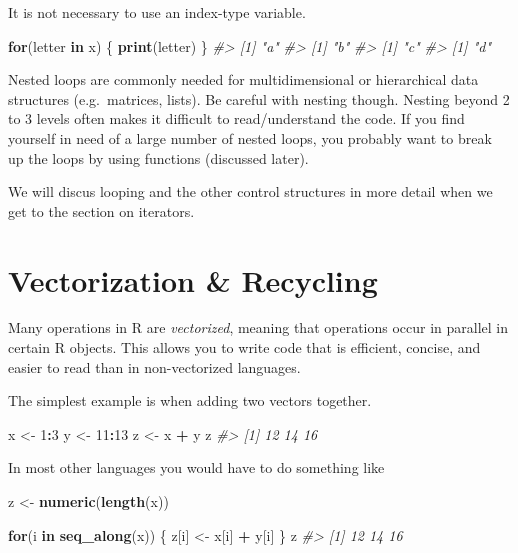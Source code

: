\documentclass[]{book}
\newenvironment{Shaded}{\begin{snugshade}}{\end{snugshade}}
\newcommand{\CommentTok}[1]{\textcolor[rgb]{0.56,0.35,0.01}{\textit{#1}}}
\newcommand{\ControlFlowTok}[1]{\textcolor[rgb]{0.13,0.29,0.53}{\textbf{#1}}}
\newcommand{\DecValTok}[1]{\textcolor[rgb]{0.00,0.00,0.81}{#1}}
\newcommand{\KeywordTok}[1]{\textcolor[rgb]{0.13,0.29,0.53}{\textbf{#1}}}
\newcommand{\NormalTok}[1]{#1}
\newcommand{\OperatorTok}[1]{\textcolor[rgb]{0.81,0.36,0.00}{\textbf{#1}}}
\newcommand{\StringTok}[1]{\textcolor[rgb]{0.31,0.60,0.02}{#1}}
\theoremstyle{definition}
\theoremstyle{definition}
\theoremstyle{definition}
\theoremstyle{remark}
\let\BeginKnitrBlock\begin \let\EndKnitrBlock\end
\begin{document}
It is not necessary to use an index-type variable.

\begin{Shaded}
\begin{Highlighting}[]
\ControlFlowTok{for}\NormalTok{(letter }\ControlFlowTok{in}\NormalTok{ x) \{}
        \KeywordTok{print}\NormalTok{(letter)}
\NormalTok{\}}
\CommentTok{#> [1] "a"}
\CommentTok{#> [1] "b"}
\CommentTok{#> [1] "c"}
\CommentTok{#> [1] "d"}
\end{Highlighting}
\end{Shaded}

\BeginKnitrBlock{rmdtip}
Nested loops are commonly needed for multidimensional or hierarchical
data structures (e.g.~matrices, lists). Be careful with nesting though.
Nesting beyond 2 to 3 levels often makes it difficult to read/understand
the code. If you find yourself in need of a large number of nested
loops, you probably want to break up the loops by using functions
(discussed later).
\EndKnitrBlock{rmdtip}

We will discus looping and the other control structures in more detail
when we get to the section on iterators.

\hypertarget{vectorization-recycling}{%
\section{Vectorization \& Recycling}\label{vectorization-recycling}}

Many operations in R are \emph{vectorized}, meaning that operations
occur in parallel in certain R objects. This allows you to write code
that is efficient, concise, and easier to read than in non-vectorized
languages.

The simplest example is when adding two vectors together.

\begin{Shaded}
\begin{Highlighting}[]
\NormalTok{x <-}\StringTok{ }\DecValTok{1}\OperatorTok{:}\DecValTok{3}
\NormalTok{y <-}\StringTok{ }\DecValTok{11}\OperatorTok{:}\DecValTok{13}
\NormalTok{z <-}\StringTok{ }\NormalTok{x }\OperatorTok{+}\StringTok{ }\NormalTok{y}
\NormalTok{z}
\CommentTok{#> [1] 12 14 16}
\end{Highlighting}
\end{Shaded}

In most other languages you would have to do something like

\begin{Shaded}
\begin{Highlighting}[]
\NormalTok{z <-}\StringTok{ }\KeywordTok{numeric}\NormalTok{(}\KeywordTok{length}\NormalTok{(x))}

\ControlFlowTok{for}\NormalTok{(i }\ControlFlowTok{in} \KeywordTok{seq_along}\NormalTok{(x)) \{}
\NormalTok{      z[i] <-}\StringTok{ }\NormalTok{x[i] }\OperatorTok{+}\StringTok{ }\NormalTok{y[i]}
\NormalTok{\}}
\NormalTok{z}
\CommentTok{#> [1] 12 14 16}
\end{Highlighting}
\end{Shaded}
\end{document}
